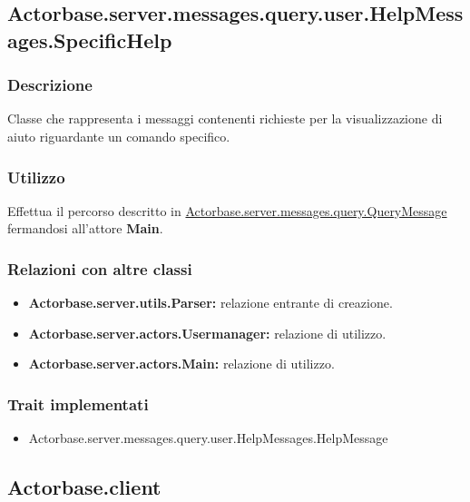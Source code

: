 \documentclass[a4paper]{article}
\begin{document}
		\subsection{Actorbase.server.messages.query.user.HelpMessages.SpecificHelp}
			\subsubsection{Descrizione}
				Classe che rappresenta i messaggi contenenti richieste per la visualizzazione di aiuto riguardante un comando specifico.
				
			\subsubsection{Utilizzo}
				Effettua il percorso descritto in \hyperref[QueryMessage]{Actorbase.server.messages.query.QueryMessage} fermandosi all'attore \textbf{Main}.
				
			\subsubsection{Relazioni con altre classi}
				\begin{itemize}
					\item \textbf{Actorbase.server.utils.Parser:} relazione entrante di creazione.
					\item \textbf{Actorbase.server.actors.Usermanager:} relazione di utilizzo.
					\item \textbf{Actorbase.server.actors.Main:} relazione di utilizzo.
				\end{itemize}
			\subsubsection{Trait implementati}
				\begin{itemize}
					\item Actorbase.server.messages.query.user.HelpMessages.HelpMessage
				\end{itemize}
			
		\subsection{Actorbase.client}
		
\end{document}
